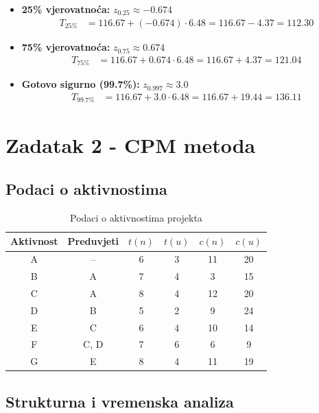 \documentclass[12pt,a4paper]{article}
\begin{document}
\begin{itemize}
\item \textbf{25\% vjerovatnoća:} $z_{0.25} \approx -0.674$
  \begin{align}
  T_{25\%} &= 116.67 + (-0.674) \cdot 6.48 = 116.67 - 4.37 = 112.30
  \end{align}

\item \textbf{75\% vjerovatnoća:} $z_{0.75} \approx 0.674$
  \begin{align}
  T_{75\%} &= 116.67 + 0.674 \cdot 6.48 = 116.67 + 4.37 = 121.04
  \end{align}

\item \textbf{Gotovo sigurno (99.7\%):} $z_{0.997} \approx 3.0$
  \begin{align}
  T_{99.7\%} &= 116.67 + 3.0 \cdot 6.48 = 116.67 + 19.44 = 136.11
  \end{align}
\end{itemize}

\section{Zadatak 2 - CPM metoda}

\subsection{Podaci o aktivnostima}

\begin{table}[h]
\centering
\begin{tabular}{cccccc}
\toprule
Aktivnost & Preduvjeti & $t(n)$ & $t(u)$ & $c(n)$ & $c(u)$ \\
\midrule
A & -- & 6 & 3 & 11 & 20 \\
B & A & 7 & 4 & 3 & 15 \\
C & A & 8 & 4 & 12 & 20 \\
D & B & 5 & 2 & 9 & 24 \\
E & C & 6 & 4 & 10 & 14 \\
F & C, D & 7 & 6 & 6 & 9 \\
G & E & 8 & 4 & 11 & 19 \\
\bottomrule
\end{tabular}
\caption{Podaci o aktivnostima projekta}
\end{table}

\subsection{Strukturna i vremenska analiza}
\end{document}

